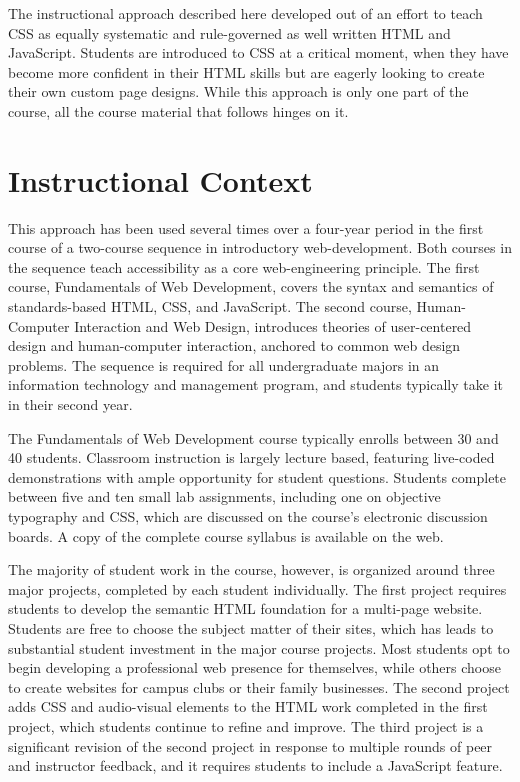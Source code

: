 \documentclass[sigplan,screen]{acmart}
\begin{document}
The instructional approach described here developed out of an effort to teach CSS as equally systematic and rule-governed as well written HTML and JavaScript. Students are introduced to CSS at a critical moment, when they have become more confident in their HTML skills but are eagerly looking to create their own custom page designs. While this approach is only one part of the course, all the course material that follows hinges on it.

\section{Instructional Context}

This approach has been used several times over a four-year period in the first course of a two-course sequence in introductory web-development. Both courses in the sequence teach accessibility as a core web-engineering principle. The first course, Fundamentals of Web Development, covers the syntax and semantics of standards-based HTML, CSS, and JavaScript. The second course, Human-Computer Interaction and Web Design, introduces theories of user-centered design and human-computer interaction, anchored to common web design problems. The sequence is required for all undergraduate majors in an information technology and management program, and students typically take it in their second year.

The Fundamentals of Web Development course typically enrolls between 30 and 40 students. Classroom instruction is largely lecture based, featuring live-coded demonstrations with ample opportunity for student questions. Students complete between five and ten small lab assignments, including one on objective typography and CSS, which are discussed on the course's electronic discussion boards. A copy of the complete course syllabus is available on the web\cite{kas:fwd}.

The majority of student work in the course, however, is organized around three major projects, completed by each student individually. The first project requires students to develop the semantic HTML foundation for a multi-page website. Students are free to choose the subject matter of their sites, which has leads to substantial student investment in the major course projects. Most students opt to begin developing a professional web presence for themselves, while others choose to create websites for campus clubs or their family businesses. The second project adds CSS and audio-visual elements to the HTML work completed in the first project, which students continue to refine and improve. The third project is a significant revision of the second project in response to multiple rounds of peer and instructor feedback, and it requires students to include a JavaScript feature.
\end{document}
